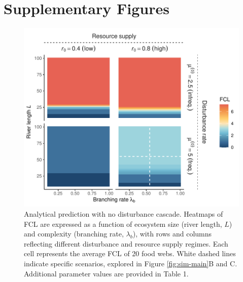 \newpage

\section{Supplementary Figures}\label{supplementary-figures}

\begin{figure}
\centering
\includegraphics{../data_fmt/fig_rho0.pdf}
\caption{Analytical prediction with no disturbance cascade. Heatmaps of
FCL are expressed as a function of ecosystem size (river length, \(L\))
and complexity (branching rate, \(\lambda_b\)), with rows and columns
reflecting different disturbance and resource supply regimes. Each cell
represents the average FCL of 20 food webs. White dashed lines indicate
specific scenarios, explored in Figure \ref{fig:sim-main}B and C.
Additional parameter values are provided in Table 1.}
\end{figure}

\newpage


